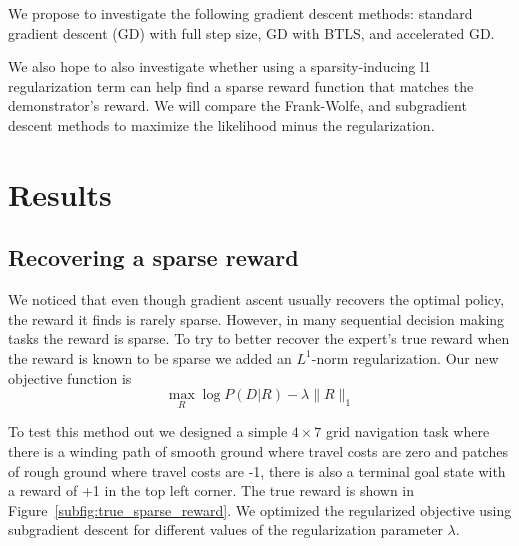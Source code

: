 \documentclass[10pt,a4paper]{article}
\begin{document}
We propose to investigate the following gradient descent methods: standard gradient descent (GD) with full step size, GD with BTLS, and accelerated GD.

We also hope to also investigate whether using a sparsity-inducing l1 regularization term can help find a sparse reward function that matches the demonstrator's reward. We will compare the Frank-Wolfe, and subgradient descent methods to maximize the likelihood minus the regularization. 

\section{Results}
\subsection{Recovering a sparse reward}
We noticed that even though gradient ascent usually recovers the optimal policy, the reward it finds is rarely sparse. However, in many sequential decision making tasks the reward is sparse. To try to better recover the expert's true reward when the reward is known to be sparse we added an $L^1$-norm regularization. Our new objective function is 
\begin{equation}
\max_R \log P(D|R) - \lambda \|R\|_1
\end{equation}

To test this method out we designed a simple $4\times 7$ grid navigation task where there is a winding path of smooth ground where travel costs are zero and patches of rough ground where travel costs are -1, there is also a terminal goal state with a reward of +1 in the top left corner. The true reward is shown in Figure~\ref{subfig:true_sparse_reward}. We optimized the regularized objective using subgradient descent for different values of the regularization parameter $\lambda$.
\end{document}
